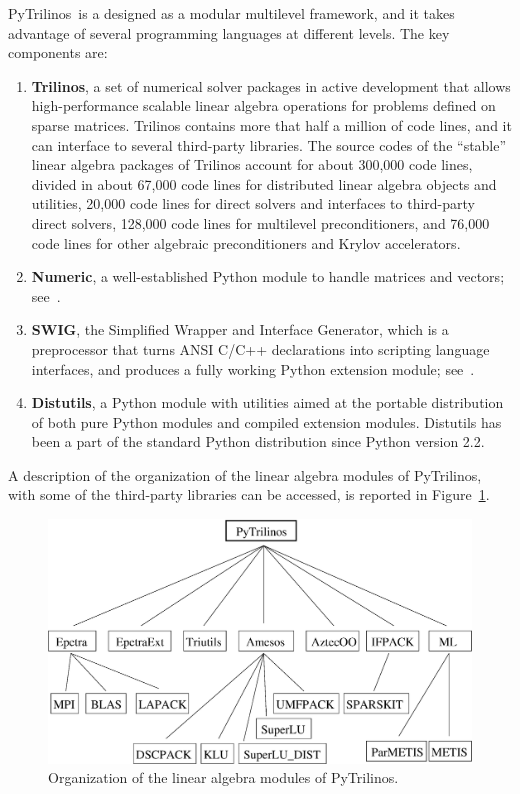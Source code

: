 \documentclass[10pt,relax]{SANDreport}
\newcommand{\PyTrilinos}{{PyTrilinos}}
\begin{document}
\PyTrilinos\ is a designed as a modular multilevel framework, and it
takes advantage of several programming languages at different levels.
The key components are:
\begin{enumerate}

\item {\bf Trilinos}, a set of numerical solver packages in active
  development that allows high-performance scalable linear algebra
  operations for problems defined on sparse matrices. Trilinos
  contains more that half a million of code lines, and it can
  interface to several third-party libraries. The source codes of the
  ``stable'' linear algebra packages of Trilinos account for about 300,000
  code lines, divided in about 67,000 code lines for distributed linear
  algebra objects and utilities, 20,000 code lines for direct solvers and
  interfaces to third-party direct solvers, 128,000 code lines for multilevel
  preconditioners, and 76,000 code lines for other algebraic preconditioners
  and Krylov accelerators.

\item {\bf Numeric}, a well-established Python module to handle
  matrices and vectors; see~\cite{numeric}.

\item {\bf SWIG}, the Simplified Wrapper and Interface Generator,
  which is a preprocessor that turns ANSI C/C++ declarations into
  scripting language interfaces, and produces a fully working Python
  extension module; see~\cite{swig}.

\item {\bf Distutils}, a Python module with utilities aimed at the
  portable distribution of both pure Python modules and compiled
  extension modules.  Distutils has been a part of the standard Python
  distribution since Python version 2.2.

\end{enumerate}

A description of the organization of  the linear algebra modules of
PyTrilinos, with some of the third-party libraries can be accessed,
is reported in Figure~\ref{fig:organization}.

\begin{figure}
\begin{center}
\includegraphics[width=12cm]{../UsersGuide/organization.eps}
\caption{Organization of the linear algebra modules of PyTrilinos.}
\label{fig:organization}
\end{center}
\end{figure}
\end{document}
